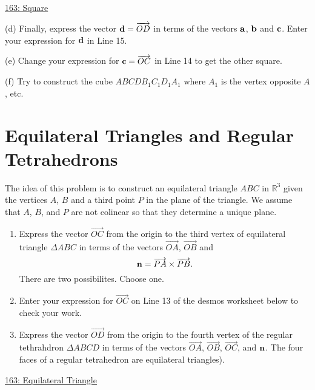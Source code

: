 \documentclass{ximera}
\begin{document}
\begin{question}
\href{https://www.desmos.com/3d/uule7dqdl4}{163: Square}

(d) Finally, express the vector ${\bf d} = \overrightarrow{OD}$ in terms of the vectors ${\bf a}$, ${\bf b}$ and ${\bf c}$. Enter your expression for ${\bf d}$ in Line 15. 

(e) Change your expression for ${\bf c} = \overrightarrow{OC}$ in Line 14 to get the other square.

(f) Try to construct the cube $ABCDB_1C_1D_1A_1$ where $A_1$ is the vertex opposite $A$, etc. 

\end{question}

\section{Equilateral Triangles and Regular Tetrahedrons}



\begin{question}  \label{Qdfdsffrr3tg}
The idea of this problem is to construct an equilateral triangle $ABC$ in $\mathbb{R}^3$ given the vertices $A$, $B$ and a third point $P$ in the plane of the triangle. We assume that $A$, $B$, and $P$ are not colinear so that they determine a unique plane.

\begin{enumerate}
\item{Express the vector $\overrightarrow{OC}$ from the origin to the third vertex of equilateral triangle $\Delta ABC$ in terms of the vectors $\overrightarrow{OA}$, $\overrightarrow{OB}$ and 
\[
    {\bf n} = \overrightarrow{PA}  \times \overrightarrow{PB}.
\]
There are two possibilites. Choose one.
}

\item{Enter your expression for $\overrightarrow{OC}$ on Line 13 of the desmos worksheet below to check your work.}

\item{Express the vector $\overrightarrow{OD}$ from the origin to the fourth vertex of the regular tethrahdron $\Delta ABCD$ in terms of the vectors $\overrightarrow{OA}$, $\overrightarrow{OB}$, $\overrightarrow{OC}$, and ${\bf n}$. The four faces of a regular tetrahedron are equilateral triangles).  
}

\end{enumerate}

\begin{onlineOnly}
    \begin{center}
\end{center}
\end{onlineOnly}

\href{https://www.desmos.com/3d/3fktg1c31g}{163: Equilateral Triangle}

\end{question}
\end{document}
